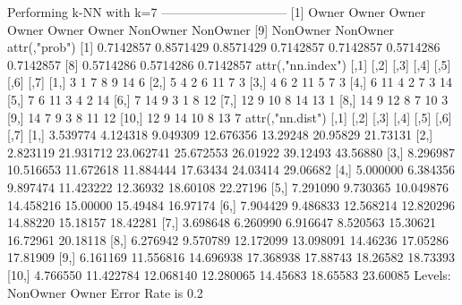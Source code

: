\documentclass{article}
\begin{document}
\begin{Schunk}
\begin{Soutput}
Performing k-NN with k=7
 ------------------------------
 [1] Owner    Owner    Owner    Owner    Owner    Owner    NonOwner NonOwner
 [9] NonOwner NonOwner
attr(,"prob")
 [1] 0.7142857 0.8571429 0.8571429 0.7142857 0.7142857 0.5714286 0.7142857
 [8] 0.5714286 0.5714286 0.7142857
attr(,"nn.index")
      [,1] [,2] [,3] [,4] [,5] [,6] [,7]
 [1,]    3    1    7    8    9   14    6
 [2,]    5    4    2    6   11    7    3
 [3,]    4    6    2   11    5    7    3
 [4,]    6   11    4    2    7    3   14
 [5,]    7    6   11    3    4    2   14
 [6,]    7   14    9    3    1    8   12
 [7,]   12    9   10    8   14   13    1
 [8,]   14    9   12    8    7   10    3
 [9,]   14    7    9    3    8   11   12
[10,]   12    9   14   10    8   13    7
attr(,"nn.dist")
          [,1]      [,2]      [,3]      [,4]     [,5]     [,6]     [,7]
 [1,] 3.539774  4.124318  9.049309 12.676356 13.29248 20.95829 21.73131
 [2,] 2.823119 21.931712 23.062741 25.672553 26.01922 39.12493 43.56880
 [3,] 8.296987 10.516653 11.672618 11.884444 17.63434 24.03414 29.06682
 [4,] 5.000000  6.384356  9.897474 11.423222 12.36932 18.60108 22.27196
 [5,] 7.291090  9.730365 10.049876 14.458216 15.00000 15.49484 16.97174
 [6,] 7.904429  9.486833 12.568214 12.820296 14.88220 15.18157 18.42281
 [7,] 3.698648  6.260990  6.916647  8.520563 15.30621 16.72961 20.18118
 [8,] 6.276942  9.570789 12.172099 13.098091 14.46236 17.05286 17.81909
 [9,] 6.161169 11.556816 14.696938 17.368938 17.88743 18.26582 18.73393
[10,] 4.766550 11.422784 12.068140 12.280065 14.45683 18.65583 23.60085
Levels: NonOwner Owner
Error Rate is  0.2


\end{Soutput}
\end{Schunk}
\end{document}
